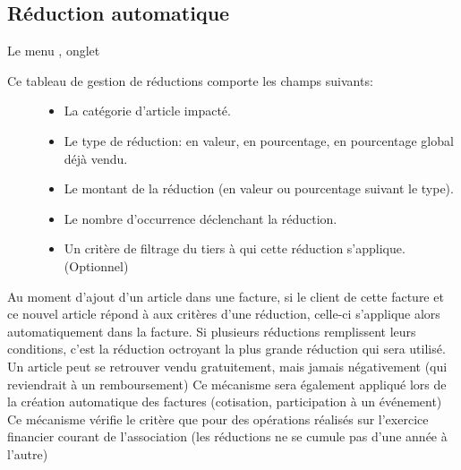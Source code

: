 \documentclass[a4paper,10pt,oneside,french]{sphinxmanual}
\begin{document}
\subsection{Réduction automatique}
\label{\detokenize{invoice/configuration:reduction-automatique}}
Le menu , onglet 
\begin{description}
\item[{Ce tableau de gestion de réductions comporte les champs suivants:}] \leavevmode\begin{itemize}
\item {} 
La catégorie d’article impacté.

\item {} 
Le type de réduction: en valeur, en pourcentage, en pourcentage global déjà vendu.

\item {} 
Le montant de la réduction (en valeur ou pourcentage suivant le type).

\item {} 
Le nombre d’occurrence déclenchant la réduction.

\item {} 
Un critère de filtrage du tiers à qui cette réduction s’applique. (Optionnel)

\end{itemize}

\end{description}

Au moment d’ajout d’un article dans une facture, si le client de cette facture et ce nouvel article répond à aux critères d’une réduction,
celle-ci s’applique alors automatiquement dans la facture.
Si plusieurs réductions remplissent leurs conditions, c’est la réduction octroyant la plus grande réduction qui sera utilisé.
Un article peut se retrouver vendu gratuitement, mais jamais négativement (qui reviendrait à un remboursement)
Ce mécanisme sera également appliqué lors de la création automatique des factures (cotisation, participation à un événement)
Ce mécanisme vérifie le critère que pour des opérations réalisés sur l’exercice financier courant de l’association (les réductions ne se cumule pas d’une année à l’autre)
\end{document}
